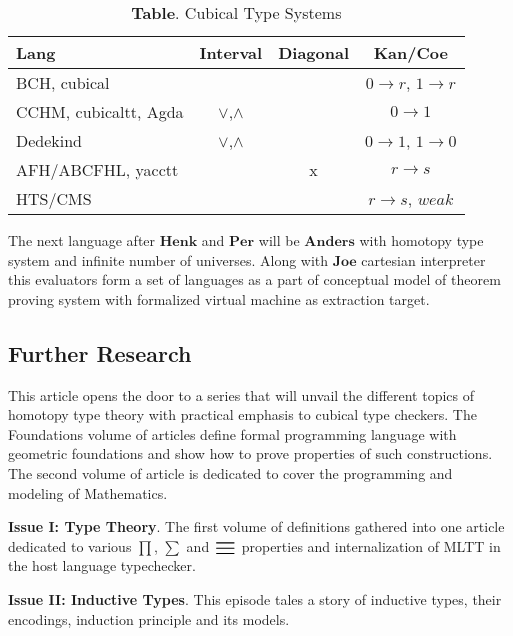 \documentclass{article}
\theoremstyle{definition}
\begin{document}
\begin{table}[!ht]
  \centering
  \caption*{\textbf{Table}. Cubical Type Systems}
  \begin{adjustbox}{width=\columnwidth,center}
  \begin{tabular}{lccc}
    \hline
       Lang & Interval & Diagonal & Kan/Coe\\
    \hline
       BCH, cubical        & & & $0\rightarrow r$, $1 \rightarrow r$\\
       CCHM, cubicaltt, Agda       & $\lor$,$\land$ & & $0 \rightarrow 1$\\
       Dedekind          & $\lor$,$\land$ & & $0 \rightarrow 1$, $1 \rightarrow 0$\\
       AFH/ABCFHL, yacctt & & x & $r \rightarrow s$\\
       HTS/CMS    & &   & $r \rightarrow s$, $weak$\\
  \end{tabular}
  \end{adjustbox}
\end{table}

The next language after $\mathbf{Henk}$ and $\mathbf{Per}$ will
be $\mathbf{Anders}$ with homotopy type system and infinite number of universes.
Along with $\mathbf{Joe}$ cartesian interpreter this evaluators form a set of
languages as a part of conceptual model of theorem proving system with
formalized virtual machine as extraction target.

\newpage
\subsection*{Further Research}

This article opens the door to a series that will unvail the different topics of
homotopy type theory with practical emphasis to cubical type checkers.
The Foundations volume of articles define formal programming language
with geometric foundations and show how to prove properties of such constructions.
The second volume of article is dedicated to cover the programming and modeling of Mathematics.

{\bf Issue I: Type Theory}.
The first volume of definitions gathered into one article dedicated to
various $\prod$, $\sum$ and $\raisebox{-0.6ex}{\scalebox{2.0}{$\equiv$}}$
properties and internalization of MLTT in the host language typechecker.

{\bf Issue II: Inductive Types}.
This episode tales a story of inductive types, their encodings,
induction principle and its models.
\end{document}
